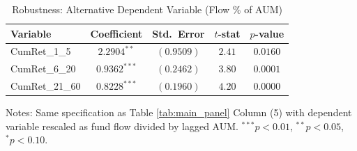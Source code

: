 \begin{table}[htbp]\centering
\caption{Robustness: Alternative Dependent Variable (Flow \% of AUM)}
\label{tab:flow_pct}
\begin{tabular}{lcccc}
\toprule
Variable & Coefficient & Std.\ Error & $t$-stat & $p$-value \\
\midrule
CumRet\_1\_5 & $2.2904^{**}$ & $(0.9509)$ & $2.41$ & $0.0160$ \\
CumRet\_6\_20 & $0.9362^{***}$ & $(0.2462)$ & $3.80$ & $0.0001$ \\
CumRet\_21\_60 & $0.8228^{***}$ & $(0.1960)$ & $4.20$ & $0.0000$ \\
\bottomrule
\end{tabular}
\begin{tablenotes}\small
\item Notes: Same specification as Table \ref{tab:main_panel} Column (5)
with dependent variable rescaled as fund flow divided by lagged AUM.
$^{***}p<0.01$, $^{**}p<0.05$, $^{*}p<0.10$.
\end{tablenotes}
\end{table}